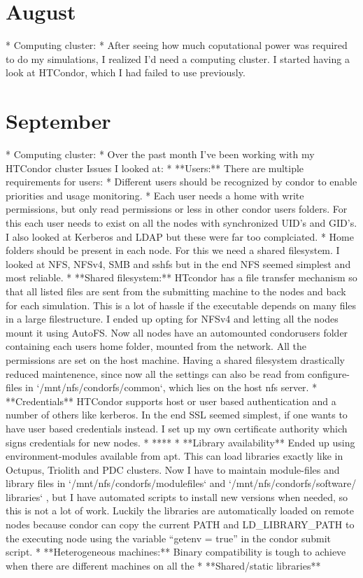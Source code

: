 \documentclass[a4paper]{article}
\begin{document}
	
\section*{August}
\begin{markdown}
* Computing cluster:
	* After seeing how much coputational power was required to do my simulations, I realized I'd need a computing cluster. I started having a look at HTCondor, which I had failed to use previously.
	

\end{markdown}
 
	


\section*{September}
\begin{markdown}
* Computing cluster:
	* Over the past month I've been working with my HTCondor cluster Issues I looked at:
		* **Users:** There are multiple requirements for users:
			* Different users should be recognized by condor to enable priorities and usage monitoring. 
			* Each user needs a home with write permissions, but only read permissions or less in other condor users folders. For this each user needs to exist on all the nodes with synchronized UID's and GID's. I also looked at Kerberos and LDAP but these were far too complciated. 
			* Home folders should be present in each node. For this we need a shared filesystem. I looked at NFS, NFSv4, SMB and sshfs but in the end NFS seemed simplest and most  reliable.
		* **Shared filesystem:** HTcondor has a file transfer mechanism so that all listed files are sent from the submitting machine to the nodes and back for each simulation. This is a lot of hassle if the executable depends on many files in a large filestructure. I ended up opting for NFSv4 and letting all the nodes mount it using AutoFS. Now all nodes have an automounted condorusers folder containing each users home folder, mounted from the network. All the permissions are set on the host machine. Having a shared filesystem drastically reduced maintenence, since now all the settings can also be read from configure-files in `/mnt/nfs/condorfs/common`, which lies on the host nfs server.
		* **Credentials** HTCondor supports host or user based authentication and a number of others like kerberos. In the end SSL seemed simplest, if one wants to have user based credentials instead. I set up my own certificate authority which signs credentials for new nodes.
		* ****
		* **Library availability** Ended up using environment-modules available from apt. This can load libraries exactly like in Octupus, Triolith and PDC clusters. Now I have to maintain module-files and library files in `/mnt/nfs/condorfs/modulefiles` and `/mnt/nfs/condorfs/software/ libraries` , but I have automated scripts to install new versions when needed, so this is not a lot of work. Luckily the libraries are automatically loaded on remote nodes because condor can copy the current PATH and LD_LIBRARY_PATH to the executing node using the variable ``getenv = true'' in the condor submit script.
		* **Heterogeneous machines:** Binary compatibility is tough to achieve when there are different machines on all the 
		* **Shared/static libraries**



\end{markdown}
\end{document}
